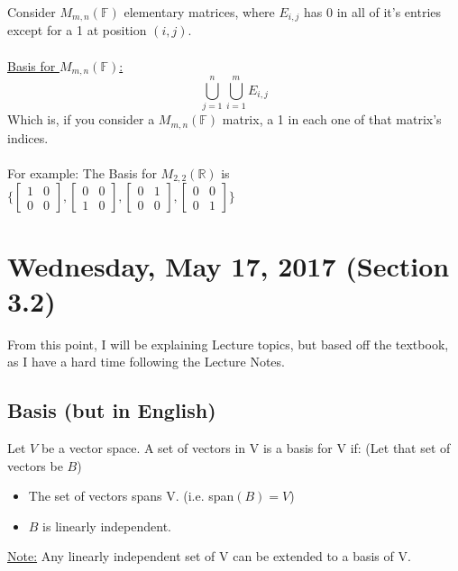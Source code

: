 \documentclass[12pt]{article}
\begin{document}
Consider $M_{m,n} (\mathbb{F})$ elementary matrices, where $E_{i,j}$ has 0 in all of it's entries except for a 1 at position $(i,j)$.\\
\\
\underline{Basis for $M_{m,n} (\mathbb{F})$:} $$\bigcup\limits_{j=1}^{n} \bigcup\limits_{i=1}^{m} E_{i,j}$$ Which is, if you consider a $M_{m,n} (\mathbb{F})$ matrix, a 1 in each one of that matrix's indices.\\
\\
For example: The Basis for $M_{2,2} (\mathbb{R})$ is $\{ 
\begin{bmatrix} 
1 & 0 \\
0 & 0 
\end{bmatrix},
\begin{bmatrix} 
0 & 0 \\
1 & 0 
\end{bmatrix},
\begin{bmatrix} 
0 & 1 \\
0 & 0 
\end{bmatrix},
\begin{bmatrix} 
0 & 0 \\
0 & 1 
\end{bmatrix}
 \}$
 
\newpage

\section{Wednesday, May 17, 2017 (Section 3.2)}

From this point, I will be explaining Lecture topics, but based off the textbook, as I have a hard time following the Lecture Notes.

\subsection{Basis (but in English)}

\begin{tcolorbox}[title=Basis for a Vector Space]
	Let $V$ be a vector space. A set of vectors in V is a basis for V if:
	(Let that set of vectors be $B$)
	\begin{itemize}
		\item{The set of vectors spans V. (i.e. span$(B) = V$)}
		\item{$B$ is linearly independent.}
	\end{itemize}
\end{tcolorbox}

\underline{Note:} Any linearly independent set of V can be extended to a basis of V.
\end{document}
